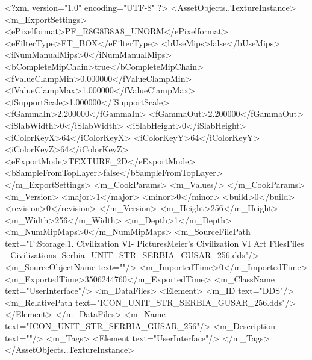 <?xml version="1.0" encoding="UTF-8" ?>
<AssetObjects..TextureInstance>
	<m_ExportSettings>
		<ePixelformat>PF_R8G8B8A8_UNORM</ePixelformat>
		<eFilterType>FT_BOX</eFilterType>
		<bUseMips>false</bUseMips>
		<iNumManualMips>0</iNumManualMips>
		<bCompleteMipChain>true</bCompleteMipChain>
		<fValueClampMin>0.000000</fValueClampMin>
		<fValueClampMax>1.000000</fValueClampMax>
		<fSupportScale>1.000000</fSupportScale>
		<fGammaIn>2.200000</fGammaIn>
		<fGammaOut>2.200000</fGammaOut>
		<iSlabWidth>0</iSlabWidth>
		<iSlabHeight>0</iSlabHeight>
		<iColorKeyX>64</iColorKeyX>
		<iColorKeyY>64</iColorKeyY>
		<iColorKeyZ>64</iColorKeyZ>
		<eExportMode>TEXTURE_2D</eExportMode>
		<bSampleFromTopLayer>false</bSampleFromTopLayer>
	</m_ExportSettings>
	<m_CookParams>
		<m_Values/>
	</m_CookParams>
	<m_Version>
		<major>1</major>
		<minor>0</minor>
		<build>0</build>
		<revision>0</revision>
	</m_Version>
	<m_Height>256</m_Height>
	<m_Width>256</m_Width>
	<m_Depth>1</m_Depth>
	<m_NumMipMaps>0</m_NumMipMaps>
	<m_SourceFilePath text="F:\Mod Storage\2.1. Civilization VI\Mods\Archive - Pictures\Sid Meier's Civilization VI Art Files\Art Files - Civilizations\Civilization - Serbia\ICON_UNIT_STR_SERBIA_GUSAR_256.dds"/>
	<m_SourceObjectName text=""/>
	<m_ImportedTime>0</m_ImportedTime>
	<m_ExportedTime>3506244760</m_ExportedTime>
	<m_ClassName text="UserInterface"/>
	<m_DataFiles>
		<Element>
			<m_ID text="DDS"/>
			<m_RelativePath text="ICON_UNIT_STR_SERBIA_GUSAR_256.dds"/>
		</Element>
	</m_DataFiles>
	<m_Name text="ICON_UNIT_STR_SERBIA_GUSAR_256"/>
	<m_Description text=""/>
	<m_Tags>
		<Element text="UserInterface"/>
	</m_Tags>
</AssetObjects..TextureInstance>

